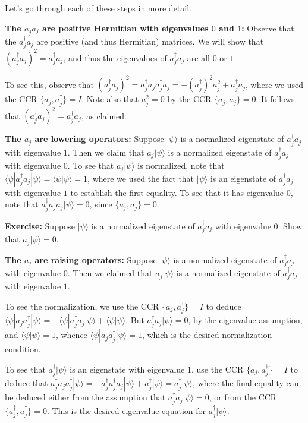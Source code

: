 \documentclass[12pt]{article}
\begin{document}
{Let's go through each of these steps in more detail.

\textbf{The $a_j^\dagger a_j$ are positive Hermitian with eigenvalues
  $0$ and $1$:} Observe that the $a_j^\dagger a_j$ are positive (and
thus Hermitian) matrices.  We will show that $(a_j^\dagger a_j)^2 =
a_j^\dagger a_j$, and thus the eigenvalues of $a_j^\dagger a_j$ are
all $0$ or $1$.

To see this, observe that $(a_j^\dagger a_j)^2 = a_j^\dagger a_j
a_j^\dagger a_j = -(a_j^\dagger)^2 a_j^2 + a_j^\dagger a_j$, where we
used the CCR $\{a_j,a_j^\dagger \} = I$.  Note also that $a_j^2 = 0$
by the CCR $\{a_j,a_j\} = 0$.  It follows that $(a_j^\dagger a_j)^2 =
a_j^\dagger a_j$, as claimed.

\textbf{The $a_j$ are lowering operators:} Suppose $|\psi\rangle$ is a
normalized eigenstate of $a_j^\dagger a_j$ with eigenvalue $1$.  Then
we claim that $a_j|\psi\rangle$ is a normalized eigenstate of
$a_j^\dagger a_j$ with eigenvalue $0$.  To see that $a_j|\psi\rangle$
is normalized, note that $\langle \psi|a_j^\dagger a_j |\psi\rangle =
\langle \psi|\psi\rangle = 1$, where we used the fact that
$|\psi\rangle$ is an eigenstate of $a_j^\dagger a_j$ with eigenvalue
$1$ to establish the first equality.  To see that it has eigenvalue
$0$, note that $a_j^\dagger a_j a_j|\psi\rangle = 0$, since $\{
a_j,a_j \} = 0$.

\textbf{Exercise:} Suppose $|\psi\rangle$ is a normalized eigenstate
of $a_j^\dagger a_j$ with eigenvalue $0$.  Show that $a_j |\psi\rangle
= 0$.

\textbf{The $a_j$ are raising operators:} Suppose $|\psi\rangle$ is a
normalized eigenstate of $a_j^\dagger a_j$ with eigenvalue $0$.  Then
we claimed that $a_j^\dagger|\psi\rangle$ is a normalized eigenstate
of $a_j^\dagger a_j$ with eigenvalue $1$.

To see the normalization, we use the CCR $\{ a_j,a_j^\dagger \} = I$
to deduce $\langle \psi|a_j a_j^\dagger |\psi\rangle = -\langle
\psi|a_j^\dagger a_j|\psi\rangle + \langle \psi|\psi\rangle$.  But
$a_j^\dagger a_j|\psi\rangle = 0$, by the eigenvalue assumption, and
$\langle \psi|\psi\rangle = 1$, whence $\langle \psi|a_j a_j^\dagger
|\psi\rangle = 1$, which is the desired normalization condition.

To see that $a_j^\dagger |\psi\rangle$ is an eigenstate with
eigenvalue $1$, use the CCR $\{a_j,a_j^\dagger \} = I$ to deduce that
$a_j^\dagger a_j a_j^\dagger |\psi\rangle = - a_j^\dagger a_j^\dagger
a_j|\psi\rangle + a_j^\dagger|\psi\rangle = a_j^\dagger |\psi\rangle$,
where the final equality can be deduced either from the assumption
that $a_j^\dagger a_j |\psi\rangle = 0$, or from the CCR $\{
a_j^\dagger,a_j^\dagger \} = 0$.  This is the desired eigenvalue
equation for $a_j^\dagger|\psi\rangle$.

}
\end{document}
